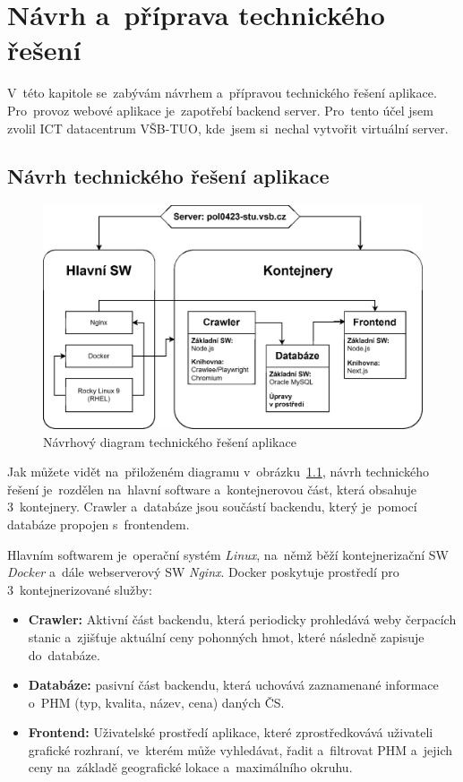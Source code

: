 \chapter{Návrh a~příprava technického řešení}
\label{ch:design-and-prepaparions}

V~této kapitole se~zabývám návrhem a~přípravou technického řešení
aplikace. Pro~provoz webové aplikace je~zapotřebí backend server.
Pro~tento účel jsem zvolil ICT datacentrum VŠB-TUO, kde~jsem si~nechal
vytvořit virtuální server.

\section{Návrh technického řešení aplikace}
\label{sec:technical-design}

\begin{figure}
    \centering
    \includegraphics[width=0.75\linewidth]{Figures/structure.eps}
    \caption{Návrhový diagram technického řešení aplikace}
    \label{fig:structure-diagram}
\end{figure}

Jak můžete vidět na~přiloženém diagramu
v~obrázku~\ref{fig:structure-diagram}, návrh technického řešení
je~rozdělen na~hlavní software a~kontejnerovou část, která obsahuje
3~kontejnery. Crawler a~databáze jsou součástí backendu, který je~pomocí
databáze propojen s~frontendem.

Hlavním softwarem je~operační systém \emph{Linux}, na~němž běží
kontejnerizační SW \emph{Docker} a~dále webserverový SW \emph{Nginx}.
Docker poskytuje prostředí pro 3~kontejnerizované služby:

\begin{itemize}
    \item \textbf{Crawler:} Aktivní část backendu, která periodicky
        prohledává weby čerpacích stanic a~zjišťuje aktuální ceny
        pohonných hmot, které následně zapisuje do~databáze.
    \item \textbf{Databáze:} pasivní část backendu, která uchovává
        zaznamenané informace o~PHM (typ, kvalita, název, cena)
        daných ČS.
    \item \textbf{Frontend:} Uživatelské prostředí aplikace, které
        zprostředkovává uživateli grafické rozhraní, ve~kterém může
        vyhledávat, řadit a~filtrovat PHM a~jejich ceny na~základě
        geografické lokace a~maximálního okruhu.
\end{itemize}

